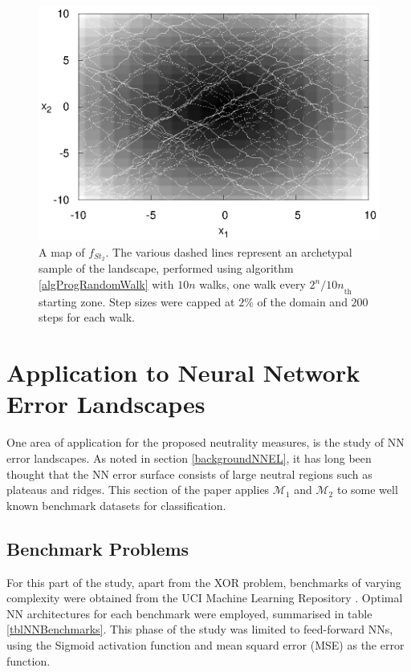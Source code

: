 \documentclass[conference]{IEEEtran}
\begin{document}
\begin{figure}[!t]
	\centering
	\includegraphics[width=\linewidth]{step2Sampled}%
		
	\caption{A map of $f_{\textit{St}_2}$. The various dashed lines represent an archetypal sample of the landscape, performed using algorithm \ref{algProgRandomWalk} with $10n$ walks, one walk every ${2^n/10n}_{\text{th}}$ starting zone. Step sizes were capped at $2\%$ of the domain and $200$ steps for each walk.}
	\label{figStep2Sampled}
\end{figure}

\section{Application to Neural Network Error Landscapes}
\label{nnELApplication}
One area of application for the proposed neutrality measures, is the study of NN error landscapes. As noted in section \ref{backgroundNNEL}, it has long been thought that the NN error surface consists of large neutral regions such as plateaus and ridges. This section of the paper applies ${\mathcal{M}_1}$ and ${\mathcal{M}_2}$ to some well known benchmark datasets for classification.

\subsection{Benchmark Problems}
\label{nnBenchmarks}
For this part of the study, apart from the XOR problem, benchmarks of varying complexity were obtained from the UCI Machine Learning Repository \cite{Lichman2013}. Optimal NN architectures for each benchmark were employed, summarised in table \ref{tblNNBenchmarks}. This phase of the study was limited to feed-forward NNs, using the Sigmoid activation function and mean squard error (MSE) as the error function.
\end{document}
